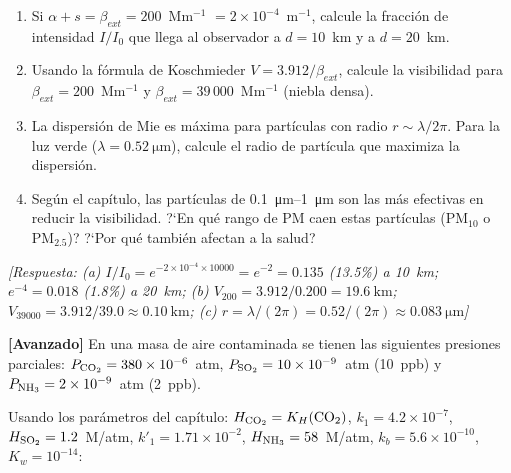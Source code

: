 \begin{bloque_ejercicios}
\begin{ejercicios}
\begin{enumerate}[label=\alph*)]
    \item Si $\alpha + s = \beta_{ext} = 200$~Mm$^{-1}$
          $= 2\times10^{-4}$~m$^{-1}$, calcule la fracci\'on
          de intensidad $I/I_0$ que llega al observador
          a $d = 10$~km y a $d = 20$~km.
    \item Usando la f\'ormula de Koschmieder
          $V = 3.912/\beta_{ext}$, calcule la visibilidad
          para $\beta_{ext} = 200$~Mm$^{-1}$ y
          $\beta_{ext} = 39\,000$~Mm$^{-1}$ (niebla densa).
    \item La dispersi\'on de Mie es m\'axima para part\'iculas
          con radio $r \sim \lambda/2\pi$. Para la luz verde
          ($\lambda = \SI{0.52}{\micro\metre}$), calcule el
          radio de part\'icula que maximiza la dispersi\'on.
    \item Seg\'un el cap\'itulo, las part\'iculas de
          \SIrange{0.1}{1}{\micro\metre} son las m\'as efectivas
          en reducir la visibilidad. ?`En qu\'e rango de
          PM caen estas part\'iculas (PM$_{10}$ o PM$_{2.5}$)?
          ?`Por qu\'e tambi\'en afectan a la salud?
\end{enumerate}

\textit{[Respuesta:
(a) $I/I_0 = e^{-2\times10^{-4}\times10000}
    = e^{-2} = 0.135$ (13.5\%) a 10~km;
    $e^{-4} = 0.018$ (1.8\%) a 20~km;
(b) $V_{200} = 3.912/0.200 = \SI{19.6}{\kilo\metre}$;
    $V_{39000} = 3.912/39.0 \approx \SI{0.10}{\kilo\metre}$;
(c) $r = \lambda/(2\pi)
    = 0.52/(2\pi) \approx \SI{0.083}{\micro\metre}$]}

\item \textbf{[Avanzado]} En una masa de aire contaminada se tienen
las siguientes presiones parciales:
$P_{\ce{CO2}} = 380\times10^{-6}$~atm,
$P_{\ce{SO2}} = 10\times10^{-9}$~atm (10~ppb) y
$P_{\ce{NH3}} = 2\times10^{-9}$~atm (2~ppb).

Usando los par\'ametros del cap\'itulo:
$H_{\ce{CO2}} = K_H(\ce{CO2})$, $k_1 = 4.2\times10^{-7}$,
$H_{\ce{SO2}} = 1.2$~M/atm, $k'_1 = 1.71\times10^{-2}$,
$H_{\ce{NH3}} = 58$~M/atm, $k_b = 5.6\times10^{-10}$,
$K_w = 10^{-14}$:


\end{ejercicios}
\end{bloque_ejercicios}
